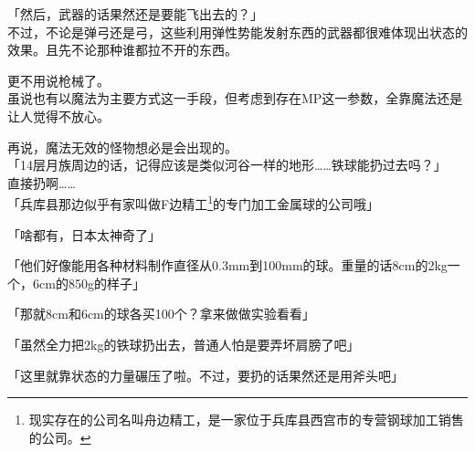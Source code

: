「然后，武器的话果然还是要能飞出去的？」\\

不过，不论是弹弓还是弓，这些利用弹性势能发射东西的武器都很难体现出状态的效果。且先不论那种谁都拉不开的东西。

更不用说枪械了。\\

虽说也有以魔法为主要方式这一手段，但考虑到存在MP这一参数，全靠魔法还是让人觉得不放心。

再说，魔法无效的怪物想必是会出现的。\\

「14层月族周边的话，记得应该是类似河谷一样的地形……铁球能扔过去吗？」\\

直接扔啊……\\

「兵库县那边似乎有家叫做F边精工\footnote{现实存在的公司名叫舟边精工，是一家位于兵库县西宫市的专营钢球加工销售的公司。}的专门加工金属球的公司哦」

「啥都有，日本太神奇了」

「他们好像能用各种材料制作直径从0.3mm到100mm的球。重量的话8cm的2kg一个，6cm的850g的样子」

「那就8cm和6cm的球各买100个？拿来做做实验看看」

「虽然全力把2kg的铁球扔出去，普通人怕是要弄坏肩膀了吧」

「这里就靠状态的力量碾压了啦。不过，要扔的话果然还是用斧头吧」

